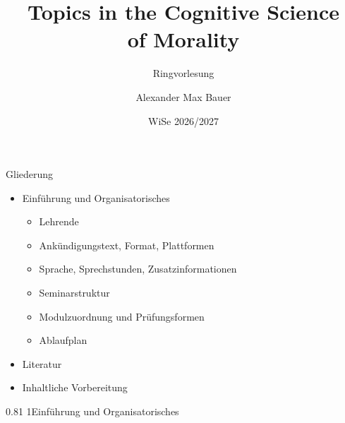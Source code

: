 \documentclass[xcolor=table,9pt,aspectratio=169]{beamer}
\title{Topics in the Cognitive Science\\of Morality}
\subtitle{Ringvorlesung}
\author{Alexander Max Bauer}
\date{WiSe 2026/2027}
\begin{document}
{
\begin{frame}
   \maketitle
\end{frame}
}


\begin{frame}{\vspace*{10mm}Gliederung}
\begin{itemize}
   \item[1] Einführung und Organisatorisches
   \begin{itemize}
      \item Lehrende
      \item Ankündigungstext, Format, Plattformen
      \item Sprache, Sprechstunden, Zusatzinformationen
      \item Seminarstruktur
      \item Modulzuordnung und Prüfungsformen
      \item Ablaufplan
   \end{itemize}
   \item[2] Literatur
   \item[3] Inhaltliche Vorbereitung
\end{itemize}
\end{frame}


\begin{frame}
\begin{overlayarea}{\textwidth}{0.81\paperheight}{
   \vspace*{11mm}
   \textcolor{uolblue}
   {1\hspace*{1em}Einführung und Organisatorisches}
}
\end{overlayarea}
\end{frame}
\end{document}
